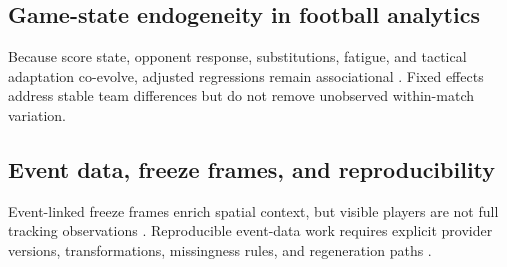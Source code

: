 \subsection{Game-state endogeneity in football analytics}
Because score state, opponent response, substitutions, fatigue, and tactical adaptation co-evolve, adjusted regressions remain associational \citep{VERIFY_ENDOGENEITY_REFERENCE}. Fixed effects address stable team differences but do not remove unobserved within-match variation.

\subsection{Event data, freeze frames, and reproducibility}
Event-linked freeze frames enrich spatial context, but visible players are not full tracking observations \citep{VERIFY_360_REFERENCE}. Reproducible event-data work requires explicit provider versions, transformations, missingness rules, and regeneration paths \citep{VERIFY_REPRODUCIBILITY_REFERENCE}.
